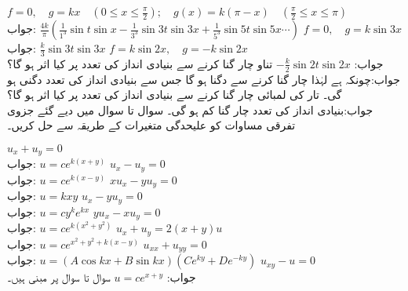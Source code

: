 \quad
$f=0,\quad g=kx \quad (0\le x\le \tfrac{\pi}{2});\quad g(x)=k(\pi-x)\quad (\tfrac{\pi}{2}\le x\le \pi)$\\
جواب:\quad
$\tfrac{4k}{\pi}(\tfrac{1}{1^3}\sin t\sin x-\tfrac{1}{3^3}\sin 3t\sin 3x+\tfrac{1}{5^3}\sin 5t\sin 5x\cdots)$
\quad
$f=0,\quad g=k\sin 3x$\\
جواب:\quad
$\tfrac{k}{3}\sin 3t\sin 3x$
\quad
$f=k\sin 2x,\quad g=-k\sin 2x$\\
جواب:\quad
$-\tfrac{k}{2}\sin 2t\sin 2x$
\quad
تناو  چار گنا کرنے سے بنیادی انداز کی تعدد پر کیا اثر ہو گا؟\\
جواب:\quad چونکہ  ہے لہٰذا  چار گنا کرنے سے  دگنا ہو گا جس سے بنیادی انداز کی تعدد دگنی ہو گی۔
\quad
تار کی لمبائی  چار گنا کرنے سے بنیادی انداز کی تعدد پر کیا اثر ہو گا؟\\
جواب:\quad بنیادی انداز کی تعدد چار گنا کم ہو گی۔
سوال  تا سوال  میں دیے گئے جزوی تفرقی مساوات کو علیحدگی متغیرات کے طریقہ سے حل کریں۔

\quad
$u_x+u_y=0$\\
جواب:\quad
$u=ce^{k(x+y)}$
\quad
$u_x-u_y=0$\\
جواب:\quad
$u=ce^{k(x-y)}$
\quad
$xu_x-yu_y=0$\\
جواب:\quad
$u=kxy$
\quad
$u_x-yu_y=0$\\
جواب:\quad
$u=cy^ke^{kx}$
\quad
$yu_x-xu_y=0$\\
جواب:\quad
$u=ce^{k(x^2+y^2)}$
\quad
$u_x+u_y=2(x+y)u$\\
جواب:\quad
$u=ce^{x^2+y^2+k(x-y)}$
\quad
$u_{xx}+u_{yy}=0$\\
جواب:\quad
$u=(A\cos kx+B\sin kx)(Ce^{ky}+De^{-ky})$
\quad
$u_{xy}-u=0$\\
جواب:\quad
$u=ce^{x+y}$
سوال  تا سوال   پر مبنی ہیں۔

